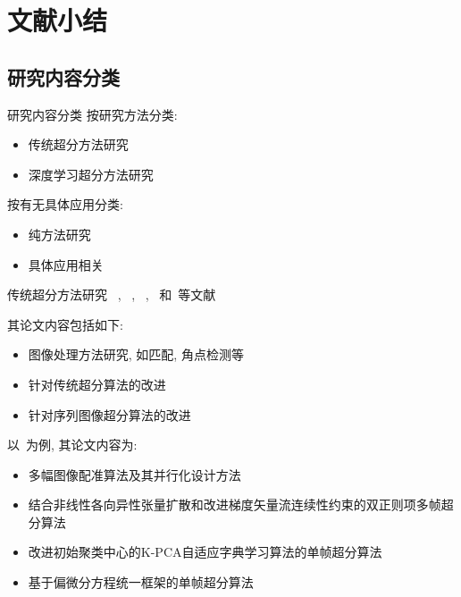 \section{文献小结}

\subsection{研究内容分类}
\begin{frame}{研究内容分类}
    按研究方法分类:
    \begin{itemize}
        \item 传统超分方法研究
        \item 深度学习超分方法研究
    \end{itemize}
    \vspace{1cm}
    按有无具体应用分类:
    \begin{itemize}
        \item 纯方法研究
        \item 具体应用相关
    \end{itemize}
\end{frame}

\begin{frame}{传统超分方法研究}
    ~\cite{guoxx}, ~\cite{zhaoxd}, ~\cite{liaoxx}, ~\cite{xuy}和~\cite{liz}等文献
    
    其论文内容包括如下: 
    \begin{itemize}
        \item 图像处理方法研究, 如匹配, 角点检测等 
        \item 针对传统超分算法的改进
        \item 针对序列图像超分算法的改进
    \end{itemize}

    以~\cite{zhaoxd}为例, 其论文内容为:
    \begin{itemize}
        \item 多幅图像配准算法及其并行化设计方法
        \item 结合非线性各向异性张量扩散和改进梯度矢量流连续性约束的双正则项多帧超分算法
        \item 改进初始聚类中心的K-PCA自适应字典学习算法的单帧超分算法
        \item 基于偏微分方程统一框架的单帧超分算法
    \end{itemize}
\end{frame}

